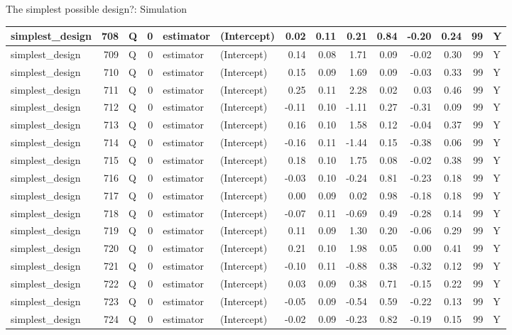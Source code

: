 \documentclass[
  11pt,
  ignorenonframetext,
]{beamer}
\begin{document}
\begin{frame}[fragile]{The simplest possible design?: Simulation}
\begin{tabular}{l|r|l|r|l|l|r|r|r|r|r|r|r|l}
\hline
simplest\_design & 708 & Q & 0 & estimator & (Intercept) & 0.02 & 0.11 & 0.21 & 0.84 & -0.20 & 0.24 & 99 & Y\\
\hline
simplest\_design & 709 & Q & 0 & estimator & (Intercept) & 0.14 & 0.08 & 1.71 & 0.09 & -0.02 & 0.30 & 99 & Y\\
\hline
simplest\_design & 710 & Q & 0 & estimator & (Intercept) & 0.15 & 0.09 & 1.69 & 0.09 & -0.03 & 0.33 & 99 & Y\\
\hline
simplest\_design & 711 & Q & 0 & estimator & (Intercept) & 0.25 & 0.11 & 2.28 & 0.02 & 0.03 & 0.46 & 99 & Y\\
\hline
simplest\_design & 712 & Q & 0 & estimator & (Intercept) & -0.11 & 0.10 & -1.11 & 0.27 & -0.31 & 0.09 & 99 & Y\\
\hline
simplest\_design & 713 & Q & 0 & estimator & (Intercept) & 0.16 & 0.10 & 1.58 & 0.12 & -0.04 & 0.37 & 99 & Y\\
\hline
simplest\_design & 714 & Q & 0 & estimator & (Intercept) & -0.16 & 0.11 & -1.44 & 0.15 & -0.38 & 0.06 & 99 & Y\\
\hline
simplest\_design & 715 & Q & 0 & estimator & (Intercept) & 0.18 & 0.10 & 1.75 & 0.08 & -0.02 & 0.38 & 99 & Y\\
\hline
simplest\_design & 716 & Q & 0 & estimator & (Intercept) & -0.03 & 0.10 & -0.24 & 0.81 & -0.23 & 0.18 & 99 & Y\\
\hline
simplest\_design & 717 & Q & 0 & estimator & (Intercept) & 0.00 & 0.09 & 0.02 & 0.98 & -0.18 & 0.18 & 99 & Y\\
\hline
simplest\_design & 718 & Q & 0 & estimator & (Intercept) & -0.07 & 0.11 & -0.69 & 0.49 & -0.28 & 0.14 & 99 & Y\\
\hline
simplest\_design & 719 & Q & 0 & estimator & (Intercept) & 0.11 & 0.09 & 1.30 & 0.20 & -0.06 & 0.29 & 99 & Y\\
\hline
simplest\_design & 720 & Q & 0 & estimator & (Intercept) & 0.21 & 0.10 & 1.98 & 0.05 & 0.00 & 0.41 & 99 & Y\\
\hline
simplest\_design & 721 & Q & 0 & estimator & (Intercept) & -0.10 & 0.11 & -0.88 & 0.38 & -0.32 & 0.12 & 99 & Y\\
\hline
simplest\_design & 722 & Q & 0 & estimator & (Intercept) & 0.03 & 0.09 & 0.38 & 0.71 & -0.15 & 0.22 & 99 & Y\\
\hline
simplest\_design & 723 & Q & 0 & estimator & (Intercept) & -0.05 & 0.09 & -0.54 & 0.59 & -0.22 & 0.13 & 99 & Y\\
\hline
simplest\_design & 724 & Q & 0 & estimator & (Intercept) & -0.02 & 0.09 & -0.23 & 0.82 & -0.19 & 0.15 & 99 & Y\\

\end{tabular}
\end{frame}
\end{document}
